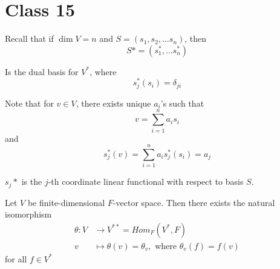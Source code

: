 \section{Class 15}

\begin{remark}

Recall that if $\dim V = n$ and $S = \left( s_1, s_2, \hdots s_n \right) $, then 
\[
    S* = (s_1^*, \hdots s_n^*)
\]

Is the dual basis for $V^*$, where 
\[
    s_j^* (s_i) = \delta_{ji}
\]


Note that for $v \in V$, there exists unique $a_i$'s such that 
\[
    v = \sum\limits_{i = 1}^{n} a_i s_i
\]
and 
\[
    s_j^*(v) = \sum\limits_{i = 1}^{n} a_i s_j^*(s_i) = a_j
\]

$s_j*$ is the $j$-th coordinate linear functional with respect to basis $S$.

\end{remark}

\begin{theorem}
    Let $V$ be finite-dimensional $F$-vector space. Then there exists the natural isomorphism 
    \begin{align*}
        \theta : V &\to V^{**} = Hom_F(V^*, F) \\
        v & \mapsto \theta(v) = \theta_v, \text{ where } \theta_v(f) = f(v)
    \end{align*}
    for all $f \in V^*$
\end{theorem}

